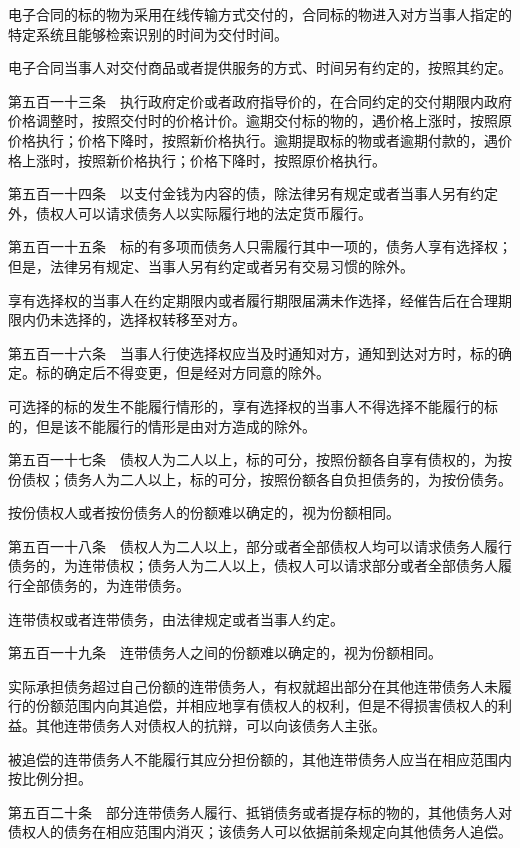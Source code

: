 \documentclass[UTF8,12pt,a4paper]{ctexbook}
\begin{document}
电子合同的标的物为采用在线传输方式交付的，合同标的物进入对方当事人指定的特定系统且能够检索识别的时间为交付时间。

电子合同当事人对交付商品或者提供服务的方式、时间另有约定的，按照其约定。

第五百一十三条　执行政府定价或者政府指导价的，在合同约定的交付期限内政府价格调整时，按照交付时的价格计价。逾期交付标的物的，遇价格上涨时，按照原价格执行；价格下降时，按照新价格执行。逾期提取标的物或者逾期付款的，遇价格上涨时，按照新价格执行；价格下降时，按照原价格执行。

第五百一十四条　以支付金钱为内容的债，除法律另有规定或者当事人另有约定外，债权人可以请求债务人以实际履行地的法定货币履行。

第五百一十五条　标的有多项而债务人只需履行其中一项的，债务人享有选择权；但是，法律另有规定、当事人另有约定或者另有交易习惯的除外。

享有选择权的当事人在约定期限内或者履行期限届满未作选择，经催告后在合理期限内仍未选择的，选择权转移至对方。

第五百一十六条　当事人行使选择权应当及时通知对方，通知到达对方时，标的确定。标的确定后不得变更，但是经对方同意的除外。

可选择的标的发生不能履行情形的，享有选择权的当事人不得选择不能履行的标的，但是该不能履行的情形是由对方造成的除外。

第五百一十七条　债权人为二人以上，标的可分，按照份额各自享有债权的，为按份债权；债务人为二人以上，标的可分，按照份额各自负担债务的，为按份债务。

按份债权人或者按份债务人的份额难以确定的，视为份额相同。

第五百一十八条　债权人为二人以上，部分或者全部债权人均可以请求债务人履行债务的，为连带债权；债务人为二人以上，债权人可以请求部分或者全部债务人履行全部债务的，为连带债务。

连带债权或者连带债务，由法律规定或者当事人约定。

第五百一十九条　连带债务人之间的份额难以确定的，视为份额相同。

实际承担债务超过自己份额的连带债务人，有权就超出部分在其他连带债务人未履行的份额范围内向其追偿，并相应地享有债权人的权利，但是不得损害债权人的利益。其他连带债务人对债权人的抗辩，可以向该债务人主张。

被追偿的连带债务人不能履行其应分担份额的，其他连带债务人应当在相应范围内按比例分担。

第五百二十条　部分连带债务人履行、抵销债务或者提存标的物的，其他债务人对债权人的债务在相应范围内消灭；该债务人可以依据前条规定向其他债务人追偿。
\end{document}
